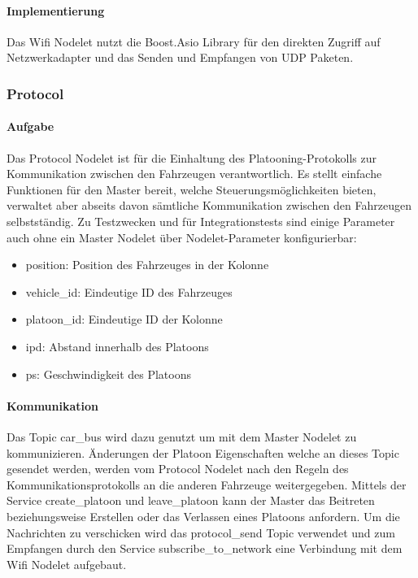 \documentclass[a4paper, 12pt, titlepage]{scrartcl}
\begin{document}
				\paragraph{Implementierung} Das Wifi Nodelet nutzt die Boost.Asio Library für den direkten Zugriff auf Netzwerkadapter und das Senden und Empfangen von UDP Paketen.
				
			
				\subsubsection{Protocol}
				\label{sw_b_protocol}
				\paragraph{Aufgabe} Das Protocol Nodelet ist für die Einhaltung des Platooning-Protokolls zur Kommunikation zwischen den Fahrzeugen verantwortlich. Es stellt einfache Funktionen für den Master bereit, welche Steuerungsmöglichkeiten bieten, verwaltet aber abseits davon sämtliche Kommunikation zwischen den Fahrzeugen selbstständig. Zu Testzwecken und für Integrationstests sind einige Parameter auch ohne ein Master Nodelet über Nodelet-Parameter konfigurierbar:
				\begin{itemize}
					\item position: Position des Fahrzeuges in der Kolonne
					\item vehicle\_id: Eindeutige ID des Fahrzeuges
					\item platoon\_id: Eindeutige ID der Kolonne
					\item ipd: Abstand innerhalb des Platoons
					\item ps: Geschwindigkeit des Platoons
				\end{itemize}
				
				\paragraph{Kommunikation} Das Topic car\_bus wird dazu genutzt um mit dem Master Nodelet zu kommunizieren. Änderungen der Platoon Eigenschaften welche an dieses Topic gesendet werden, werden vom Protocol Nodelet nach den Regeln des Kommunikationsprotokolls an die anderen Fahrzeuge weitergegeben. Mittels der Service create\_platoon und leave\_platoon kann der Master das Beitreten beziehungsweise Erstellen oder das Verlassen eines Platoons anfordern. Um die Nachrichten zu verschicken wird das protocol\_send Topic verwendet und zum Empfangen durch den Service subscribe\_to\_network eine Verbindung mit dem Wifi Nodelet aufgebaut.
				
\end{document}
